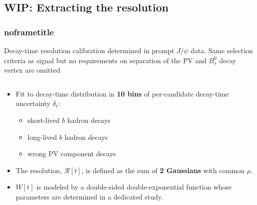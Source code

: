 \documentclass[aspectratio=169,9pt,handout]{beamer}
\newcommand{\pdfnote}[1]{}
\begin{document}
\subsection{{\color{red}WIP:} Extracting the resolution}
\begin{frame}[default] %
\frametitle{noframetitle}

Decay-time resolution calibration determined in prompt $J/\psi$ data. Same selection criteria as signal but no requirements on separation of the PV and $B_s^0$ decay vertex are omitted

\begin{columns}
  \begin{column}{1.0\textwidth}
      \begin{itemize}
      \item Fit to decay-time distribution in \textbf{10 bins} of per-candidate decay-time uncertainty $\delta_{t}$:
      \begin{itemize}
        \item short-lived $b$ hadron decays
        \item long-lived $b$ hadron decays
        \item wrong PV component decays
      \end{itemize}
      \item The resolution, $\mathcal{R}[t]$, is defined as the sum of \textbf{2 Gaussians} with common $\mu$.
      \item   $W[t]$ is modeled by a double-sided double-exponential function whose parameters
      are determined in a dedicated study.
    \end{itemize}
  \end{column}

\end{columns}

\pdfnote{First of all, everything in this section is marked as Work in Progress because some decissions were not taken, and some features of the procedure are also in discussion}
\pdfnote{The decay-time resolution is determided from J/psi prompt data. We apply the same criteria but without the requirement of separation of the PV and B decay vertex}
\pdfnote{The resolution is extracted from da fit in 10 bins of per candidadecy time uncertainty. Here we have 3 components: short lived b hadrons modelled with a Dirac delta; long lived b hadron, modelled with two exponentials; and the wrong PV component }
\pdfnote{The resolution model is composed of 2 Gaussians with common mean}

\end{frame} %
\end{document}
